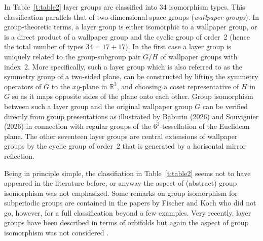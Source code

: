 \documentclass[11pt,a4paper]{article}
\newcommand{\R}{\mathbb R}
\begin{document}
In Table~\ref{t:table2} layer groups are classified into 34 isomorphism types. This classification parallels that of two-dimensional space groups (\emph{wallpaper groups}). In group-theoretic terms, a layer group is either isomorphic to a wallpaper group, or is a direct product of a wallpaper group and the cyclic group of order~2 (hence the total number of types $34=17+17$). In the first case a layer group is uniquely related to the group-subgroup pair $G/H$ of wallpaper groups with index~2. More specifically, such a layer group which is also referred to as the symmetry group of a two-sided plane, can be constructed by lifting the symmetry operators of $G$ to the $xy$-plane in $\R^3$, and choosing a coset representative of $H$ in $G$ so as it maps opposite sides of the plane onto each other. Group isomorphism between such a layer group and the original wallpaper group $G$ can be verified directly from group presentations as illustrated by Baburin (2026) and Souvignier (2026) \cite{Souv26} in connection with regular groups of the $6^3$-tessellation of the Euclidean plane. The other seventeen layer groups are central extensions of wallpaper groups by the cyclic group of order~2 that is generated by a horisontal mirror reflection. %

Being in principle simple, the classifiation in Table~\ref{t:table2} seems not to have appeared in the literature before, or anyway the aspect of (abstract) group isomorphism was not emphasized. Some remarks on group isomorphism for subperiodic groups are contained in the papers by Fischer and Koch \cite{KF75, KF78b} who did not go, however, for a full classification beyond a few examples. Very recently, layer groups have been described in terms of orbifolds but again the aspect of group isomorphism was not considered \cite{layer25}.
\end{document}

